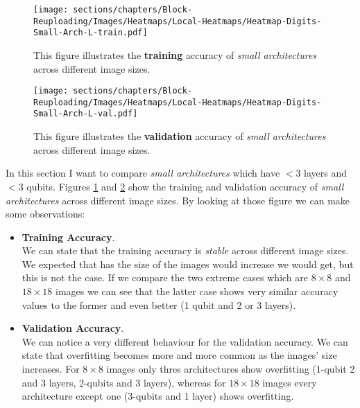 \begin{figure}[h]
    \centering
    \texttt{[image: sections/chapters/Block-Reuploading/Images/Heatmaps/Local-Heatmaps/Heatmap-Digits-Small-Arch-L-train.pdf]}
    \caption{This figure illustrates the \textbf{training} accuracy of \textit{small architectures} across different image sizes.}
    \label{fig:heatmap-Small-train}
\end{figure}

\begin{figure}[h]
    \centering
    \texttt{[image: sections/chapters/Block-Reuploading/Images/Heatmaps/Local-Heatmaps/Heatmap-Digits-Small-Arch-L-val.pdf]}
    \caption{This figure illustrates the \textbf{validation} accuracy of \textit{small architectures} across different image sizes.}
    \label{fig:heatmap-Small-val}
\end{figure}


In this section I want to compare \textit{small architectures} which have $< 3$ layers and $< 3$ qubits.
Figures \ref{fig:heatmap-Small-train} and \ref{fig:heatmap-Small-val} show the training and validation 
accuracy of \textit{small architectures} across different image sizes.
By looking at those figure we can make some observations:

\begin{itemize}
    \item \textbf{Training Accuracy}.\\
    We can state that the training accuracy is \textit{stable} across different image sizes.
    We expected that has the size of the images would increase we would get, but this is not the case.
    If we compare the two extreme cases which are $8\times8$ and $18\times18$ images we can see that 
    the latter case shows very similar accuracy values to the former and even better (1 qubit and 2 or 3 layers).
    
    \item \textbf{Validation Accuracy}.\\
    We can notice a very different behaviour for the validation accuracy.
    We can state that overfitting becomes more and more common as the images' size increases.
    For $8\times8$ images only thres architectures show overfitting (1-qubit 2 and 3 layers, 2-qubits 
    and 3 layers), whereas for $18\times18$ images every architecture except one (3-qubits and 1 layer) 
    shows overfitting.
\end{itemize}

